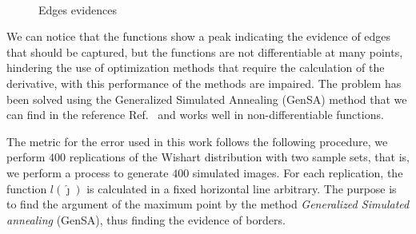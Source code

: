 \documentclass[conference]{IEEEtran}
\begin{document}
\begin{figure}[hbt]
     \hfill
     \\
     \centering
     \caption{Edges evidences}
     \label{fig_evid_bordas}
   \end{figure}	

We can notice that the functions show a peak indicating the evidence of edges that should be captured, but the functions are not differentiable at many points, hindering the use of optimization methods that require the calculation of the derivative, with this performance of the methods are impaired. The problem has been solved using the Generalized Simulated Annealing (GenSA) method that we can find in the reference Ref.~\cite{xgsh} and works well in non-differentiable functions.
    
    The metric for the error used in this work follows the following procedure, we perform $400$ replications of the Wishart distribution with two sample sets, that is, we perform a process to generate $400$ simulated images. For each replication, the function $l(\widehat\jmath)$ is calculated in a fixed horizontal line arbitrary. The purpose is to find the argument of the maximum point by the method {\it Generalized Simulated annealing} (GenSA), thus finding the evidence of borders.
    
\end{document}
